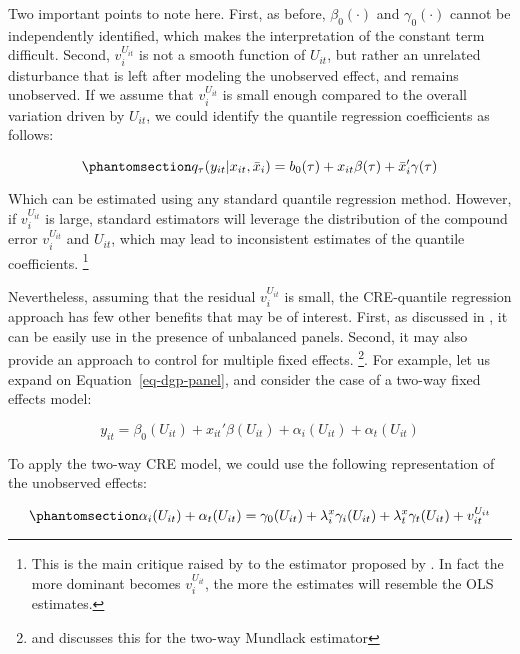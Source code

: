\documentclass[bib]{statapress}
\begin{document}
Two important points to note here. First, as before, \(\beta_0(\cdot)\)
and \(\gamma_0(\cdot)\) cannot be independently identified, which makes
the interpretation of the constant term difficult. Second,
\(v^{U_{it}}_i\) is not a smooth function of \(U_{it}\), but rather an
unrelated disturbance that is left after modeling the unobserved effect,
and remains unobserved. If we assume that \(v^{U_{it}}_i\) is small
enough compared to the overall variation driven by \(U_{it}\), we could
identify the quantile regression coefficients as follows:

\begin{equation}\phantomsection\label{eq-cre-1way}{q_\tau(y_{it}|x_{it},\bar x_i)=b_0(\tau) + x_{it}\beta(\tau)+\bar x_i'\gamma(\tau)
}\end{equation}

Which can be estimated using any standard quantile regression method.
However, if \(v^{U_{it}}_i\) is large, standard estimators will leverage
the distribution of the compound error \(v^{U_{it}}_i\) and \(U_{it}\),
which may lead to inconsistent estimates of the quantile coefficients.
\footnote{This is the main critique raised by \citet{canay2011} to the
  estimator proposed by \citet{abrevaya2008}. In fact the more dominant
  becomes \(v^{U_{it}}_i\), the more the estimates will resemble the OLS
  estimates.}

Nevertheless, assuming that the residual \(v^{U_{it}}_i\) is small, the
CRE-quantile regression approach has few other benefits that may be of
interest. First, as discussed in \citet{wooldridge2019}, it can be
easily use in the presence of unbalanced panels. Second, it may also
provide an approach to control for multiple fixed effects. \footnote{\citet{baltagi2023}
  and \citet{wooldridge2021} discusses this for the two-way Mundlack
  estimator}. For example, let us expand on Equation~\ref{eq-dgp-panel},
and consider the case of a two-way fixed effects model:

\[y_{it} = \beta_0(U_{it}) + x_{it}'\beta(U_{it}) + \alpha_i(U_{it}) + \alpha_t(U_{it})
\]

To apply the two-way CRE model, we could use the following
representation of the unobserved effects:

\begin{equation}\phantomsection\label{eq-cre-unobs}{\alpha_i(U_{it}) + \alpha_t(U_{it}) = \gamma_0(U_{it}) + \lambda_i^x \gamma_i(U_{it}) + \lambda_t^x \gamma_t(U_{it}) + v^{U_{it}}_{it}
}\end{equation}
\end{document}
